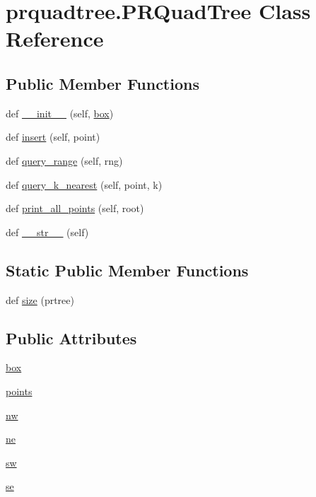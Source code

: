 \hypertarget{classprquadtree_1_1PRQuadTree}{}\section{prquadtree.\+P\+R\+Quad\+Tree Class Reference}
\label{classprquadtree_1_1PRQuadTree}
\subsection*{Public Member Functions}
\begin{DoxyCompactItemize}
\item 
def \hyperlink{classprquadtree_1_1PRQuadTree_a56de30271f808d21281b790a19448aab}{\+\_\+\+\_\+init\+\_\+\+\_\+} (self, \hyperlink{classprquadtree_1_1PRQuadTree_a2f1d8e21568aa0467a7dabedb50e3593}{box})
\item 
def \hyperlink{classprquadtree_1_1PRQuadTree_ab9ca8c1d94c56c72f47dabd2f90b7754}{insert} (self, point)
\item 
def \hyperlink{classprquadtree_1_1PRQuadTree_ab145cd20b246f04ddcd53ae9618b5479}{query\+\_\+range} (self, rng)
\item 
def \hyperlink{classprquadtree_1_1PRQuadTree_a578891ac618a6770184fc1c02f426b45}{query\+\_\+k\+\_\+nearest} (self, point, k)
\item 
def \hyperlink{classprquadtree_1_1PRQuadTree_a0d43d9d2ebe765b6690067c1d8bc5a8a}{print\+\_\+all\+\_\+points} (self, root)
\item 
def \hyperlink{classprquadtree_1_1PRQuadTree_a2f9dd431836575327c97cd3fb5426adb}{\+\_\+\+\_\+str\+\_\+\+\_\+} (self)
\end{DoxyCompactItemize}
\subsection*{Static Public Member Functions}
\begin{DoxyCompactItemize}
\item 
def \hyperlink{classprquadtree_1_1PRQuadTree_a5dd006b80f1697585a10722fba06e9ba}{size} (prtree)
\end{DoxyCompactItemize}
\subsection*{Public Attributes}
\begin{DoxyCompactItemize}
\item 
\hyperlink{classprquadtree_1_1PRQuadTree_a2f1d8e21568aa0467a7dabedb50e3593}{box}
\item 
\hyperlink{classprquadtree_1_1PRQuadTree_a6534693edb5dd5450859c5b4b0773936}{points}
\item 
\hyperlink{classprquadtree_1_1PRQuadTree_a6d0f1330cc70f704f8153fd1f386b9c3}{nw}
\item 
\hyperlink{classprquadtree_1_1PRQuadTree_acf96c88788ee32d03032c490b9a90f68}{ne}
\item 
\hyperlink{classprquadtree_1_1PRQuadTree_aee59816ff69872d39d406a103dd2e2f8}{sw}
\item 
\hyperlink{classprquadtree_1_1PRQuadTree_acf5a1f668e9962b03120856564e0a3b0}{se}
\end{DoxyCompactItemize}
